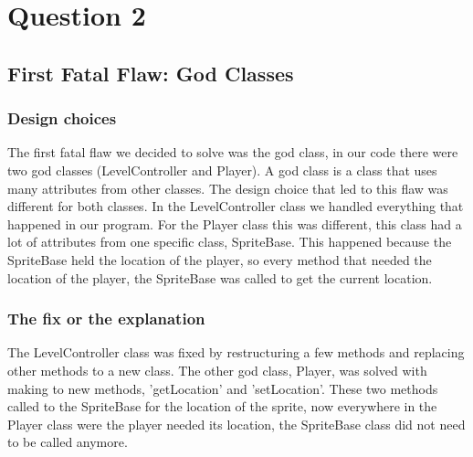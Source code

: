 \section{Question 2}
\subsection{First Fatal Flaw: God Classes}

\subsubsection{Design choices}

The first fatal flaw we decided to solve was the god class, in our code there were two god classes (LevelController and Player). A god class is a class that uses many attributes from other classes. The design choice that led to this flaw was different for both classes. In the LevelController class we handled everything that happened in our program. For the Player class this was different, this class had a lot of attributes from one specific class, SpriteBase. This happened because the SpriteBase held the location of the player, so every method that needed the location of the player, the SpriteBase was called to get the current location.

\subsubsection{The fix or the explanation}

The LevelController class was fixed by restructuring a few methods and replacing other methods to a new class. The other god class, Player, was solved with making to new methods, 'getLocation' and 'setLocation'. These two methods called to the SpriteBase for the location of the sprite, now everywhere in the Player class were the player needed its location, the SpriteBase class did not need to be called anymore.